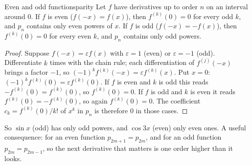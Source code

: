 \documentclass[11pt]{article}
\begin{document}
\begin{thm}{Even and odd functions}{parity}
Let $f$ have derivatives up to order $n$ on an interval around $0$. If $f$ is even ($f(-x)=f(x)$), then $f^{(k)}(0)=0$ for every odd $k$, and $p_n$ contains only even powers of $x$. If $f$ is odd ($f(-x)=-f(x)$), then $f^{(k)}(0)=0$ for every even $k$, and $p_n$ contains only odd powers.
\end{thm}
\begin{proof}
Suppose $f(-x)=\varepsilon f(x)$ with $\varepsilon=1$ (even) or $\varepsilon=-1$ (odd). Differentiate $k$ times with the chain rule; each differentiation of $f^{(j)}(-x)$ brings a factor $-1$, so $(-1)^kf^{(k)}(-x)=\varepsilon f^{(k)}(x)$. Put $x=0$: $(-1)^kf^{(k)}(0)=\varepsilon f^{(k)}(0)$. If $f$ is even and $k$ is odd this reads $-f^{(k)}(0)=f^{(k)}(0)$, so $f^{(k)}(0)=0$. If $f$ is odd and $k$ is even it reads $f^{(k)}(0)=-f^{(k)}(0)$, so again $f^{(k)}(0)=0$. The coefficient $c_k=f^{(k)}(0)/k!$ of $x^k$ in $p_n$ is therefore $0$ in those cases.
\end{proof}

So $\sin x$ (odd) has only odd powers, and $\cos3x$ (even) only even ones. A useful consequence: for an even function $p_{2m+1}=p_{2m}$, and for an odd function $p_{2m}=p_{2m-1}$, so the next derivative that matters is one order higher than it looks.
\end{document}

